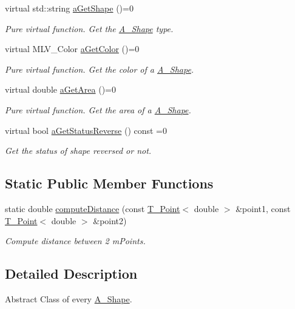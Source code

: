 \begin{DoxyCompactItemize}
virtual std\+::string \hyperlink{classA__Shape_a1b202256a4e5dcb0edab4ab93a37122c}{a\+Get\+Shape} ()=0
\begin{DoxyCompactList}\small\item\em Pure virtual function. Get the \hyperlink{classA__Shape}{A\+\_\+\+Shape} type. \end{DoxyCompactList}\item 
virtual M\+L\+V\+\_\+\+Color \hyperlink{classA__Shape_a1e90c8132d33e4ac84d42f72606193b2}{a\+Get\+Color} ()=0
\begin{DoxyCompactList}\small\item\em Pure virtual function. Get the color of a \hyperlink{classA__Shape}{A\+\_\+\+Shape}. \end{DoxyCompactList}\item 
virtual double \hyperlink{classA__Shape_a1b142ee2d873d6c217f65de1632e7b6e}{a\+Get\+Area} ()=0
\begin{DoxyCompactList}\small\item\em Pure virtual function. Get the area of a \hyperlink{classA__Shape}{A\+\_\+\+Shape}. \end{DoxyCompactList}\item 
virtual bool \hyperlink{classA__Shape_a24991f7667367b646cae75f60df22e28}{a\+Get\+Status\+Reverse} () const =0
\begin{DoxyCompactList}\small\item\em Get the status of shape reversed or not. \end{DoxyCompactList}\end{DoxyCompactItemize}
\subsection*{Static Public Member Functions}
\begin{DoxyCompactItemize}
\item 
static double \hyperlink{classA__Shape_a2c663e21cf31002323b83f9f98234d33}{compute\+Distance} (const \hyperlink{classT__Point}{T\+\_\+\+Point}$<$ double $>$ \&point1, const \hyperlink{classT__Point}{T\+\_\+\+Point}$<$ double $>$ \&point2)
\begin{DoxyCompactList}\small\item\em Compute distance between 2 m\+Points. \end{DoxyCompactList}\end{DoxyCompactItemize}


\subsection{Detailed Description}
Abstract Class of every \hyperlink{classA__Shape}{A\+\_\+\+Shape}. 

